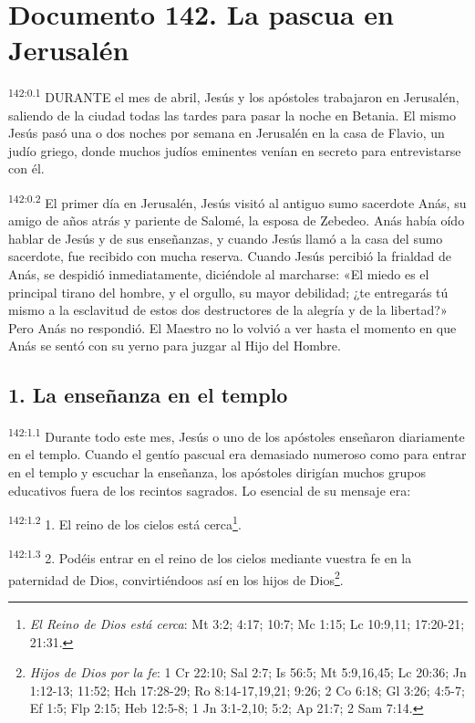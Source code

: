 \chapter{Documento 142. La pascua en Jerusalén}
\par
\textsuperscript{142:0.1} DURANTE el mes de abril, Jesús y los apóstoles trabajaron en Jerusalén, saliendo de la ciudad todas las tardes para pasar la noche en Betania. El mismo Jesús pasó una o dos noches por semana en Jerusalén en la casa de Flavio, un judío griego, donde muchos judíos eminentes venían en secreto para entrevistarse con él.

\par
\textsuperscript{142:0.2} El primer día en Jerusalén, Jesús visitó al antiguo sumo sacerdote Anás, su amigo de años atrás y pariente de Salomé, la esposa de Zebedeo. Anás había oído hablar de Jesús y de sus enseñanzas, y cuando Jesús llamó a la casa del sumo sacerdote, fue recibido con mucha reserva. Cuando Jesús percibió la frialdad de Anás, se despidió inmediatamente, diciéndole al marcharse: «El miedo es el principal tirano del hombre, y el orgullo, su mayor debilidad; ¿te entregarás tú mismo a la esclavitud de estos dos destructores de la alegría y de la libertad?» Pero Anás no respondió. El Maestro no lo volvió a ver hasta el momento en que Anás se sentó con su yerno para juzgar al Hijo del Hombre.

\section*{1. La enseñanza en el templo}
\par
\textsuperscript{142:1.1} Durante todo este mes, Jesús o uno de los apóstoles enseñaron diariamente en el templo. Cuando el gentío pascual era demasiado numeroso como para entrar en el templo y escuchar la enseñanza, los apóstoles dirigían muchos grupos educativos fuera de los recintos sagrados. Lo esencial de su mensaje era:

\par
\textsuperscript{142:1.2} 1. El reino de los cielos está cerca\footnote{\textit{El Reino de Dios está cerca}: Mt 3:2; 4:17; 10:7; Mc 1:15; Lc 10:9,11; 17:20-21; 21:31.}.

\par
\textsuperscript{142:1.3} 2. Podéis entrar en el reino de los cielos mediante vuestra fe en la paternidad de Dios, convirtiéndoos así en los hijos de Dios\footnote{\textit{Hijos de Dios por la fe}: 1 Cr 22:10; Sal 2:7; Is 56:5; Mt 5:9,16,45; Lc 20:36; Jn 1:12-13; 11:52; Hch 17:28-29; Ro 8:14-17,19,21; 9:26; 2 Co 6:18; Gl 3:26; 4:5-7; Ef 1:5; Flp 2:15; Heb 12:5-8; 1 Jn 3:1-2,10; 5:2; Ap 21:7; 2 Sam 7:14.}.

